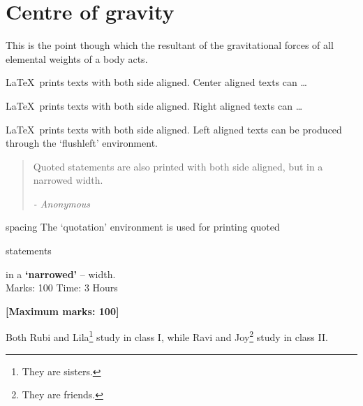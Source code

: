\documentclass[a4paper]{book}
\begin{document}
\section{Centre of gravity}\label{sec:cg2}
This is the point though which the resultant
of the gravitational forces of all elemental
weights of a body acts.
\begin{center}
    \LaTeX\ prints texts with both side aligned.
    Center aligned texts can …
\end{center}
\begin{flushright}
    \LaTeX\ prints texts with both side aligned.
    Right aligned texts can …
\end{flushright}
\begin{flushleft}
    \LaTeX\ prints texts with both side aligned.
    Left aligned texts can be produced through
    the ‘flushleft’ environment.
\end{flushleft}
\begin{quotation}
 \noindent
Quoted statements are also printed with both side
aligned, but in a narrowed width.
\begin{flushright}
{\it - Anonymous}
\end{flushright}
\end{quotation}{spacing}
The ‘quotation’ environment is used for printing
quoted \begin{sloppypar}statements\end{sloppypar} in a \textbf{`narrowed'} -- width.\\


Marks: 100 \hfill Time: 3 Hours
\begin{flushright}
    \textbf{[Maximum marks: 100]}
\end{flushright}
Both Rubi and Lila\footnote{They are sisters.} study
in class I, while Ravi and Joy\footnote{They are
friends.\label{fn:friends}} study in class II.
\end{document}
